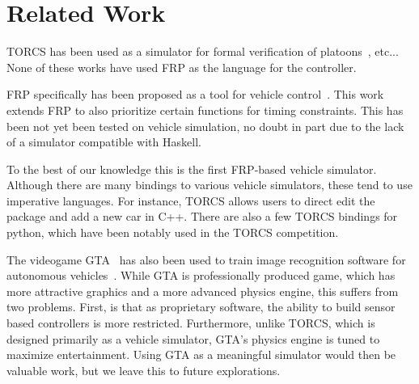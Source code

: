 \section{Related Work}

TORCS has been used as a simulator for formal verification of platoons~\cite{kamali2016formal}, etc...
None of these works have used FRP as the language for the controller.


FRP specifically has been proposed as a tool for vehicle control~\cite{kazemi2016,zou2016}.
This work extends FRP to also prioritize certain functions for timing constraints.
This has been not yet been tested on vehicle simulation, no doubt in part due to the lack of a simulator compatible with Haskell.

To the best of our knowledge this is the first FRP-based vehicle simulator.
Although there are many bindings to various vehicle simulators, these tend to use imperative languages.
For instance, TORCS allows users to direct edit the package and add a new car in C++.
There are also a few TORCS bindings for python, which have been notably used in the TORCS competition.

The videogame GTA~\cite{} has also been used to train image recognition software for autonomous vehicles~\cite{}.
While GTA is professionally produced game, which has more attractive graphics and a more advanced physics engine, this suffers from two problems.
First, is that as proprietary software, the ability to build sensor based controllers is more restricted. 
Furthermore, unlike TORCS, which is designed primarily as a vehicle simulator, GTA's physics engine is tuned to maximize entertainment.
Using GTA as a meaningful simulator would then be valuable work, but we leave this to future explorations.
